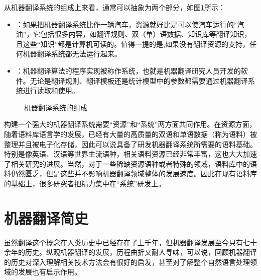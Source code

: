 \parinterval 从机器翻译系统的组成上来看，通常可以抽象为两个部分，如图\ref{fig:1-2}所示：

\begin{itemize}
\vspace{0.5em}
\item {\small{}}：如果把机器翻译系统比作一辆汽车，资源就好比是可以使汽车运行的“汽油”，它包括很多内容，如翻译规则、双（单）语数据、知识库等翻译知识，且这些“知识”都是计算机可读的。值得一提的是,如果没有翻译资源的支持，任何机器翻译系统都无法运行起来。
\vspace{0.5em}
\item {\small{}}：机器翻译算法的程序实现被称作系统，也就是机器翻译研究人员开发的软件。无论是翻译规则、翻译模板还是统计模型中的参数都需要通过机器翻译系统进行读取和使用。
\vspace{0.5em}
\end{itemize}

\begin{figure}[htp]
    \centering

    \caption{机器翻译系统的组成}
    \label{fig:1-2}
\end{figure}

\parinterval 构建一个强大的机器翻译系统需要“资源”和“系统”两方面共同作用。在资源方面，随着语料库语言学的发展，已经有大量的高质量的双语和单语数据（称为语料）被整理并且被电子化存储，因此可以说具备了研发机器翻译系统所需要的语料基础。特别是像英语、汉语等世界主流语种，相关语料资源已经非常丰富，这也大大加速了相关研究的进展。当然，对于一些稀缺资源语种或者特殊的领域，语料库中的语料仍然匮乏，但是这些并不影响机器翻译领域整体的发展速度。因此在现有语料库的基础上，很多研究者把精力集中在“系统”研发上。


\sectionnewpage
\section{机器翻译简史}

\parinterval 虽然翻译这个概念在人类历史中已经存在了上千年，但机器翻译发展至今只有七十余年的历史。纵观机器翻译的发展，历程曲折又耐人寻味，可以说，回顾机器翻译的历史对深入理解相关技术方法会有很好的启发，甚至对了解整个自然语言处理领域的发展也有启示作用。

